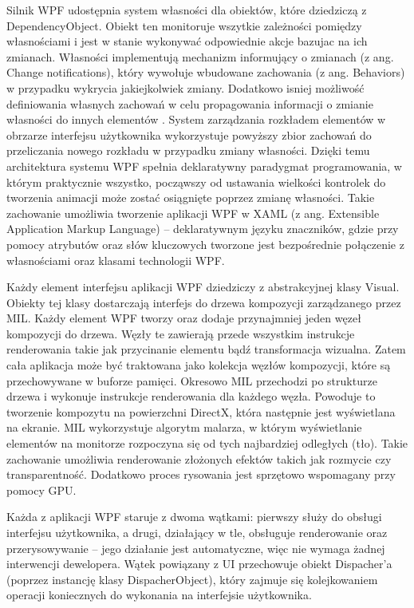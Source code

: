 Silnik WPF udostępnia system własności dla obiektów, które dziedziczą z DependencyObject. Obiekt ten monitoruje  wszytkie zależności pomiędzy własnościami i jest w stanie wykonywać odpowiednie akcje bazujac na ich zmianach. Własności implementują mechanizm informujący o zmianach (z ang. Change notifications), który wywołuje wbudowane zachowania (z ang. Behaviors) w przypadku wykrycia jakiejkolwiek zmiany. Dodatkowo isniej możliwość definiowania własnych zachowań w celu propagowania informacji o zmianie własności do innych elementów . System zarządzania rozkładem elementów w obrzarze interfejsu użytkownika wykorzystuje powyższy zbior zachowań do przeliczania nowego rozkładu w przypadku zmiany własności. Dzięki temu architektura systemu WPF spełnia deklaratywny paradygmat programowania, w którym praktycznie wszystko, począwszy od ustawania wielkości kontrolek do tworzenia animacji może zostać osiągnięte poprzez zmianę własności. Takie zachowanie umożliwia tworzenie aplikacji WPF w XAML (z ang. Extensible Application Markup Language) – deklaratywnym języku znaczników, gdzie przy pomocy atrybutów oraz słów kluczowych tworzone jest bezpośrednie połączenie z własnościami oraz klasami technologii WPF. 

Każdy element interfejsu aplikacji WPF dziedziczy z abstrakcyjnej klasy Visual. Obiekty tej klasy dostarczają interfejs do drzewa kompozycji zarządzanego przez MIL. Każdy element WPF tworzy oraz dodaje przynajmniej jeden węzeł kompozycji do drzewa. Węzły te zawierają przede wszystkim instrukcje renderowania takie jak przycinanie elementu bądź transformacja wizualna. Zatem cała aplikacja może być traktowana jako kolekcja węzłów kompozycji, które są przechowywane w buforze pamięci. Okresowo MIL przechodzi po strukturze drzewa i wykonuje instrukcje renderowania dla każdego węzła. Powoduje to tworzenie kompozytu na powierzchni DirectX, która następnie jest wyświetlana na ekranie.  MIL wykorzystuje algorytm malarza, w którym wyświetlanie elementów na monitorze rozpoczyna się od tych najbardziej odległych (tło). Takie zachowanie umożliwia renderowanie złożonych efektów takich jak rozmycie czy transparentność. Dodatkowo proces rysowania jest sprzętowo wspomagany przy pomocy GPU. 

Każda z aplikacji WPF staruje z dwoma wątkami: pierwszy służy do obsługi interfejsu użytkownika, a drugi, działający w tle, obsługuje renderowanie oraz przerysowywanie – jego działanie jest automatyczne, więc nie wymaga żadnej interwencji dewelopera. Wątek powiązany z UI przechowuje obiekt Dispacher’a (poprzez instancję klasy DispacherObject), który zajmuje się kolejkowaniem operacji koniecznych do wykonania na interfejsie użytkownika.

